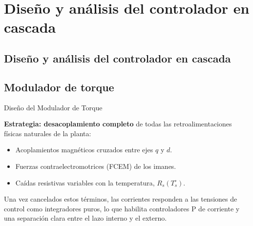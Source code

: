 \documentclass[aspectratio=169,t]{beamer}
\newcommand{\SecPresentacion}{Presentación del problema}
\newcommand{\SecMecanico}{Subsistema mecánico equivalente}
\newcommand{\SecElectromagnetico}{Subsistema electromagnético en coordenadas qd0}
\newcommand{\SecTermico}{Subsistema térmico}
\newcommand{\SecNLGlobal}{Sistema No Lineal Global}
\newcommand{\SecLPV}{Linealización Jacobiana (LPV)}
\newcommand{\SecLTI}{Obtención del modelo LTI equivalente}
\newcommand{\SecAnalisisLTI}{Análisis del modelo LTI aumentado}
\newcommand{\SecDinamica}{Respuesta dinámica en dominio del tiempo}
\newcommand{\SecControlador}{Diseño y análisis del controlador en cascada}
\newcommand{\SecVerifSpecs}{Verificación de desempeño: Especificaciones de operación}
\newcommand{\SecVerifOffset}{Verificación de desempeño: Offset de estado estacionario}
\newcommand{\SecVerifNoIdealidades}{Verificación de desempeño: No idealidades y comportamiento térmico}
\newcommand{\SecDiscretizacion}{Discretización del controlador}
\newcommand{\SecSoftware}{Codificación del software de control}
\newcommand{\AgendaItem}[3]{%
  \ifnum#1=#2
    {\scriptsize\bfseries\color{uncBlue}%
      \hyperlink{sec:#1}{\makebox[2.2em][r]{#1.}\hspace{0.7em}%
      \parbox[t]{0.86\textwidth}{#3}}\par}%
  \else
    {\scriptsize\color{black!26}%
      \hyperlink{sec:#1}{\makebox[2.2em][r]{#1.}\hspace{0.7em}%
      \parbox[t]{0.86\textwidth}{#3}}\par}%
  \fi
  \vspace{0.35mm}%
}
\newcommand{\AgendaBody}[1]{%
    \vspace{3mm}
    {\Large\bfseries\color{uncBlue}Tabla de contenidos\par}
    \vspace{2mm}
    \begin{minipage}{0.94\textwidth}
      \AgendaItem{1}{#1}{\SecPresentacion}
      \AgendaItem{2}{#1}{\SecMecanico}
      \AgendaItem{3}{#1}{\SecElectromagnetico}
      \AgendaItem{4}{#1}{\SecTermico}
      \AgendaItem{5}{#1}\SecNLGlobal
      \AgendaItem{6}{#1}{\SecLPV}
      \AgendaItem{7}{#1}{\SecLTI}
      \AgendaItem{8}{#1}{\SecAnalisisLTI}
      \AgendaItem{9}{#1}{\SecDinamica}
      \AgendaItem{10}{#1}{\SecControlador}
      \AgendaItem{11}{#1}{\SecVerifSpecs}
      \AgendaItem{12}{#1}{\SecVerifOffset}
      \AgendaItem{13}{#1}{\SecVerifNoIdealidades}
      \AgendaItem{14}{#1}{\SecDiscretizacion}
      \AgendaItem{15}{#1}{\SecSoftware}
    \end{minipage}
    \vfill
}
\newcommand{\AgendaSlideTarget}[2]{%
  \begin{frame}[plain]
    \hypertarget{#2}{}%
    \AgendaBody{#1}
  \end{frame}
}
\newcommand{\StartProjectSection}[2]{%
  \section{#2}%
  \subsection{#2}%
  \AgendaSlideTarget{#1}{sec:#1}%
}
\begin{document}

\StartProjectSection{10}{\SecControlador}
\subsection{Modulador de torque}

\begin{frame}{Diseño del Modulador de Torque}
\vspace{4mm}

\textbf{Estrategia: desacoplamiento completo} de todas las retroalimentaciones físicas naturales de la planta:
\begin{itemize}
\item Acoplamientos magnéticos cruzados entre ejes $q$ y $d$.
\item Fuerzas contraelectromotrices (FCEM) de los imanes.
\item Caídas resistivas variables con la temperatura, $R_s(T_s^\circ)$.
\end{itemize}

\vspace{2mm}
{\small Una vez cancelados estos términos, las corrientes responden a las tensiones de control como integradores puros, lo que habilita controladores P de corriente y una separación clara entre el lazo interno y el externo.}
\end{frame}
\end{document}
